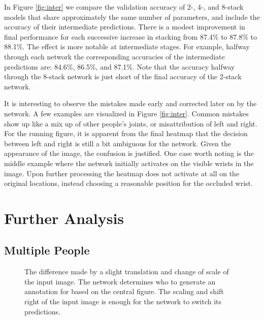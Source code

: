 \documentclass[runningheads]{llncs}
\begin{document}
In Figure \ref{fig:inter} we compare the validation accuracy of 2-,
4-, and 8-stack models that share approximately the same number of
parameters, and include the accuracy of their intermediate
predictions. There is a modest improvement in final performance for
each successive increase in stacking from 87.4\% to 87.8\% to
88.1\%. The effect is more notable at intermediate stages. For
example, halfway through each network the corresponding accuracies of
the intermediate predictions are: 84.6\%, 86.5\%, and 87.1\%. Note
that the accuracy halfway through the 8-stack network is just short of
the final accuracy of the 2-stack network.

It is interesting to observe the mistakes made early and corrected
later on by the network. A few examples are visualized in Figure
\ref{fig:inter}. Common mistakes show up like a mix up of other
people's joints, or misattribution of left and right. For the running
figure, it is apparent from the final heatmap that the decision
between left and right is still a bit ambiguous for the network. Given
the appearance of the image, the confusion is justified. One case
worth noting is the middle example where the network initially
activates on the visible wrists in the image. Upon further processing
the heatmap does not activate at all on the original locations, instead
choosing a reasonable position for the occluded wrist.



\section{Further Analysis}

\subsection{Multiple People}

\begin{figure}[t]
  \caption{The difference made by a slight translation and change of
    scale of the input image. The network determines who to generate
    an annotation for based on the central figure. The scaling and
    shift right of the input image is enough for the network to
    switch its predictions.}
  \label{fig:multi}
\end{figure}
\end{document}
